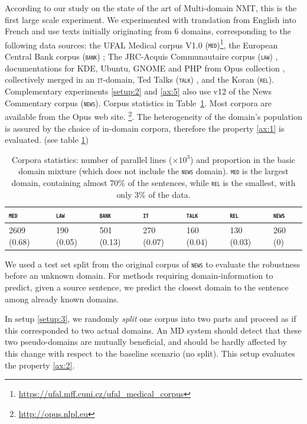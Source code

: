 \documentclass[12pt,a4paper,twoside]{report}
\theoremstyle{definition}
\newcommand{\domain}[1]{\texttt{\textsc{#1}}}
\begin{document}
According to our study on the state of the art of Multi-domain NMT, this is the first large scale experiment. We experimented with translation from English into French and use texts initially originating from 6 domains, corresponding to the following data sources: the UFAL Medical corpus V1.0 (\domain{med})\footnote{\url{https://ufal.mff.cuni.cz/ufal_medical_corpus}}, the European Central Bank corpus (\domain{bank}) \cite{Tiedemann12parallel}; The JRC-Acquis Communautaire corpus (\domain{law}) \cite{Steinberger06acquis}, documentations for KDE, Ubuntu, GNOME and PHP from Opus collection \cite{Tiedemann09news}, collectively merged in an \domain{it}-domain, Ted Talks (\domain{talk}) \cite{Cettolo12wit}, and the Koran (\domain{rel}). Complementary experiments \ref{setup:2} and \ref{ax:5}  also use v12 of the News Commentary corpus (\domain{news}). Corpus statistics in Table~\ref{tab:Corpora7}. Most corpora are available from the Opus web site. \footnote{\url{http://opus.nlpl.eu}}. The heterogeneity of the domain’s population is assured by the choice of in-domain corpora, therefore the property \ref{ax:1} is evaluated. (see table \ref{tab:Corpora7})

\begin{table}[htbp]
  \centering
  \begin{tabular}{ |lllllll|} %
    \hline
    \domain{med} & \domain{law} & \domain{bank} & \domain{it} & \domain{talk} & \domain{rel} & \domain{news} \\
    \hline
    2609 (0.68) & 190 (0.05)  & 501 (0.13) & 270 (0.07) & 160 (0.04) & 130 (0.03) & 260 (0) \\
    \hline
  \end{tabular}
\caption{Corpora statistics: number of parallel lines ($\times 10^3$) and proportion in the basic domain mixture (which does not include the \domain{news} domain). \domain{med} is the largest domain, containing almost 70\% of the sentences, while \domain{rel} is the smallest, with only 3\% of the data.}
\label{tab:Corpora7}
\end{table}

We used a test set split from the original corpus of \domain{news} to evaluate the robustness before an unknown domain. For methods requiring domain-information to predict, given a source sentence, we predict the closest domain to the sentence among already known domains.

In setup \ref{setup:3}, we randomly \emph{split} one corpus into two parts and proceed as if this corresponded to two actual domains. An MD system should detect that these two pseudo-domains are mutually beneficial, and should be hardly affected by this change with respect to the baseline scenario (no split). This setup evaluates the property \ref{ax:2}.
\end{document}
